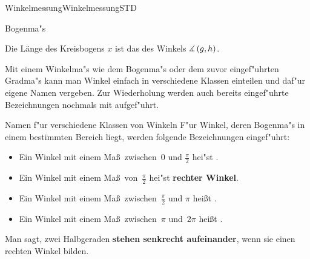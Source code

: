 \begin{MXContent}{Winkelmessung}{Winkelmessung}{STD}
\begin{MXInfo}{Bogenma"s}
\begin{center}
\end{center}

Die L\"ange des Kreisbogens $x$ ist das  
des Winkels $\measuredangle \left( g, h \right)$.
\end{MXInfo}

Mit einem Winkelma"s wie dem Bogenma"s oder dem zuvor eingef"uhrten Gradma"s
kann man Winkel einfach in verschiedene Klassen einteilen und daf"ur eigene
Namen vergeben.
Zur Wiederholung werden auch bereits eingef"uhrte Bezeichnungen nochmals 
mit aufgef"uhrt.
\begin{MXInfo}{Namen f"ur verschiedene Klassen von Winkeln}
F"ur Winkel, deren Bogenma"s in einem bestimmten Bereich liegt, werden folgende
Bezeichnungen eingef"uhrt:
\begin{itemize}
\item
Ein Winkel mit einem Ma\ss\ zwischen~$0$ und $\frac{\pi}{2}$ hei"st
.
       
\item
Ein Winkel mit einem Ma\ss\ von~$\frac{\pi}{2}$ hei"st \textbf{rechter Winkel}.
       
\item
Ein Winkel mit einem Ma\ss\ zwischen~$\frac{\pi}{2}$ und $\pi$ hei\ss t 
.
       
\item
Ein Winkel mit einem Ma\ss\ zwischen~$\pi$ und~$2 \pi$ hei\ss t 
.
\end{itemize}
Man sagt, zwei Halbgeraden \textbf{stehen senkrecht aufeinander}, 
wenn sie einen rechten Winkel bilden.


\end{MXInfo}
\end{MXContent}
